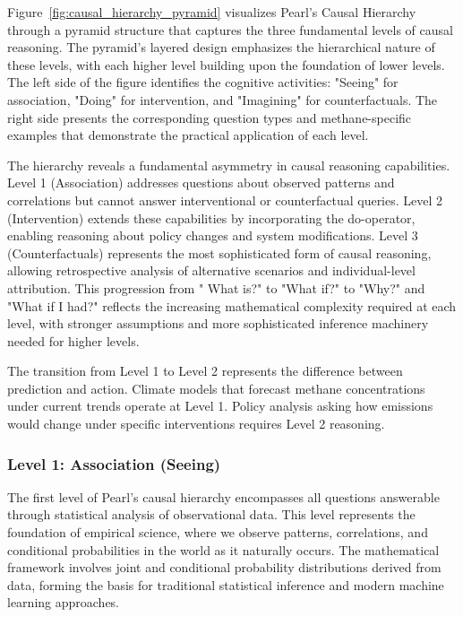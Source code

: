Figure~\ref{fig:causal_hierarchy_pyramid} visualizes Pearl's Causal Hierarchy through a pyramid structure that captures the three fundamental levels of causal reasoning. The pyramid's layered design emphasizes the hierarchical nature of these levels, with each higher level building upon the foundation of lower levels. The left side of the figure identifies the cognitive activities: "Seeing" for association, "Doing" for intervention, and "Imagining" for counterfactuals. The right side presents the corresponding question types and methane-specific examples that demonstrate the practical application of each level.

The hierarchy reveals a fundamental asymmetry in causal reasoning capabilities. Level 1 (Association) addresses questions about observed patterns and correlations but cannot answer interventional or counterfactual queries. Level 2 (Intervention) extends these capabilities by incorporating the do-operator, enabling reasoning about policy changes and system modifications. Level 3 (Counterfactuals) represents the most sophisticated form of causal reasoning, allowing retrospective analysis of alternative scenarios and individual-level attribution. This progression from " What is?" to "What if?" to "Why?" and "What if I had?" reflects the increasing mathematical complexity required at each level, with stronger assumptions and more sophisticated inference machinery needed for higher levels.

The transition from Level 1 to Level 2 represents the difference between prediction and action. Climate models that forecast methane concentrations under current trends operate at Level 1. Policy analysis asking how emissions would change under specific interventions requires Level 2 reasoning.

\subsubsection{Level 1: Association (Seeing)}

The first level of Pearl's causal hierarchy encompasses all questions answerable through statistical analysis of observational data. This level represents the foundation of empirical science, where we observe patterns, correlations, and conditional probabilities in the world as it naturally occurs. The mathematical framework involves joint and conditional probability distributions derived from data, forming the basis for traditional statistical inference and modern machine learning approaches.


